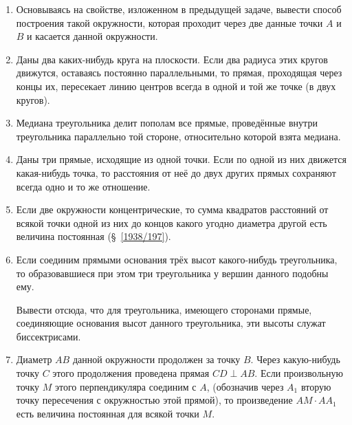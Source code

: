 \documentclass[oneside]{book}
\begin{document}
\begin{enumerate}
 \item
Основываясь на свойстве, изложенном в предыдущей задаче, вывести способ построения такой окружности, которая проходит через две данные точки $A$ и $B$ и касается данной окружности.

 \item
Даны два каких-нибудь круга на плоскости.
Если два радиуса этих кругов движутся, оставаясь постоянно параллельными, то прямая, проходящая через концы их, пересекает линию центров всегда в одной и той же точке (в  двух кругов).

 \item
Медиана треугольника делит пополам все прямые, проведённые внутри треугольника параллельно той стороне, относительно которой взята медиана.

 \item
Даны три прямые, исходящие из одной точки.
Если по одной из них движется какая-нибудь точка, то расстояния от неё до двух других прямых сохраняют всегда одно и то же отношение.

 \item
Если две окружности концентрические, то сумма квадратов расстояний от всякой точки одной из них до концов какого угодно диаметра другой есть величина постоянная (§~\ref{1938/197}).

 \item
Если соединим прямыми основания трёх высот какого-нибудь треугольника, то образовавшиеся при этом три треугольника у вершин данного подобны ему.

Вывести отсюда, что для треугольника, имеющего сторонами прямые, соединяющие основания высот данного треугольника, эти высоты служат биссектрисами.

 \item
Диаметр $AB$ данной окружности продолжен за точку $B$.
Через какую-нибудь точку $C$ этого продолжения проведена прямая $CD\perp AB$.
Если произвольную точку $M$ этого перпендикуляра соединим с $A$, (обозначив через $A_1$ вторую точку пересечения с окружностью этой прямой), то произведение $AM\cdot  AA_1$ есть величина постоянная для всякой точки $M$.

\end{enumerate}

\begin{center}
\end{center}
\end{document}

